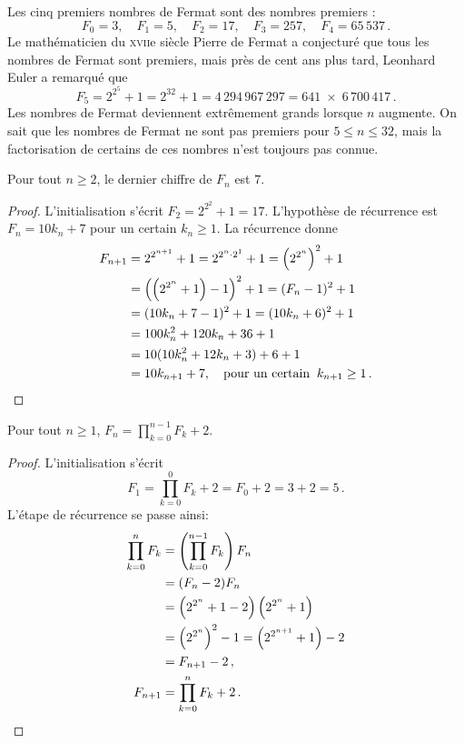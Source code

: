 Les cinq premiers nombres de Fermat sont des nombres premiers :
\[
F_0=3,\quad F_1=5,\quad F_2=17,\quad F_3=257,\quad F_4=65\,537\,.
\]
Le mathématicien du \textsc{xvii}e siècle Pierre de Fermat a conjecturé que tous les nombres de Fermat sont premiers, mais près de cent ans plus tard, Leonhard Euler a remarqué que
\[F_5=2^{2^5}+1 = 2^{32}+1 = 4\,294\,967\,297 = 641 \;\times\; 6\,700\,417\,.\]
Les nombres de Fermat deviennent extrêmement grands lorsque $n$ augmente. On sait que les nombres de Fermat ne sont pas premiers pour $5\leq n \leq 32$, mais la factorisation de certains de ces nombres n'est toujours pas connue.

\begin{theorem}
Pour tout $n\geq 2$, le dernier chiffre de $F_n$ est $7$.
\end{theorem}
\begin{proof}
L'initialisation s'écrit $F_2=2^{2^2}+1=17$.
L'hypothèse de récurrence est $F_n=10k_n+7$ pour un certain $k_n\geq 1$. La récurrence donne
\begin{align*}
F_{n+1}&=2^{2^{n+1}}+1=2^{2^{n}\cdot 2^1}+1=\left(2^{2^{n}}\right)^2+1\\
&=\left(\left(2^{2^{n}}+1\right)-1\right)^2+1=(F_n-1)^2+1\\
&=(10k_n+7-1)^2+1=(10k_n+6)^2+1\\
&=100k_n^2+120k_n+36+1\\
&=10(10k_n^2+12k_n+3)+6+1\\
&=10k_{n+1}+7,\quad \textrm{pour un certain} \;\;k_{n+1}\geq 1\,.\qedhere
\end{align*}
\end{proof}


\begin{theorem}
Pour tout $n\geq 1$, $\displaystyle F_n = \prod_{k=0}^{n-1} F_k + 2$.
\end{theorem}
\begin{proof}
L'initialisation s'écrit
\[
F_1=\prod_{k=0}^{0} F_k + 2=F_0+2=3+2=5\,.
\]
L'étape de récurrence se passe ainsi:
\begin{align*}
\prod_{k=0}^{n}F_k&=\left(\prod_{k=0}^{n-1}F_k\right) F_n \\
&=(F_n-2)F_n\\
&= \left(2^{2^n}+1-2\right)\left(2^{2^n}+1\right)\\
&= \left(2^{2^{n}}\right)^2-1= \left(2^{2^{n+1}}+1\right)-2\\
&=F_{n+1}-2\,,\\
F_{n+1}&=\prod_{k=0}^{n}F_k + 2\,. \qedhere
\end{align*}
\end{proof}


